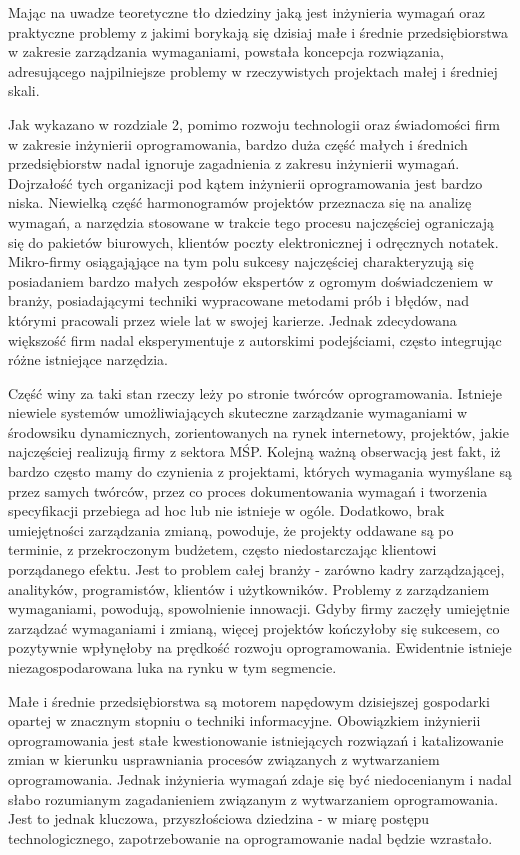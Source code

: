     Mając na uwadze teoretyczne tło dziedziny jaką jest inżynieria wymagań oraz praktyczne problemy z jakimi borykają się dzisiaj małe i średnie przedsiębiorstwa w zakresie zarządzania wymaganiami, powstała koncepcja rozwiązania, adresującego najpilniejsze problemy w rzeczywistych projektach małej i średniej skali. 

    Jak wykazano w rozdziale 2, pomimo rozwoju technologii oraz świadomości firm w zakresie inżynierii oprogramowania, bardzo duża część małych \linebreak i średnich przedsiębiorstw nadal ignoruje zagadnienia z zakresu inżynierii wymagań. Dojrzałość tych organizacji pod kątem inżynierii oprogramowania jest bardzo niska. Niewielką część harmonogramów projektów przeznacza się na analizę wymagań, a narzędzia stosowane w trakcie tego procesu najczęściej ograniczają się do pakietów biurowych, klientów poczty elektronicznej i odręcznych notatek. Mikro-firmy osiągająjące na tym polu sukcesy najczęściej charakteryzują się posiadaniem bardzo małych zespołów ekspertów z ogromym doświadczeniem w branży, posiadającymi techniki wypracowane metodami prób i błędów, nad którymi pracowali przez wiele lat w swojej karierze.  Jednak zdecydowana większość firm nadal eksperymentuje z autorskimi podejściami, często integrując różne istniejące narzędzia. 
    
    Część winy za taki stan rzeczy leży po stronie twórców oprogramowania. Istnieje niewiele systemów umożliwiających skuteczne zarządzanie wymaganiami w środowsiku dynamicznych, zorientowanych na rynek internetowy, projektów, jakie najczęściej realizują firmy z sektora MŚP. Kolejną ważną obserwacją jest fakt, iż bardzo często mamy do czynienia z projektami, których wymagania wymyślane są przez samych twórców, przez co proces dokumentowania wymagań i tworzenia specyfikacji przebiega ad hoc lub nie istnieje w ogóle. Dodatkowo, brak umiejętności zarządzania zmianą, powoduje, że projekty oddawane są po terminie, z przekroczonym budżetem, często niedostarczając klientowi porządanego efektu. Jest to problem całej branży - zarówno kadry zarządzającej, analityków, programistów, klientów i użytkowników. Problemy z zarządzaniem wymaganiami, powodują, spowolnienie innowacji. Gdyby firmy zaczęły umiejętnie zarządzać wymaganiami i zmianą, więcej projektów kończyłoby się sukcesem, co pozytywnie wpłynęłoby na prędkość rozwoju oprogramowania. Ewidentnie istnieje niezagospodarowana luka na rynku w tym segmencie. 

    Małe i średnie przedsiębiorstwa są motorem napędowym dzisiejszej gospodarki opartej w znacznym stopniu o techniki informacyjne. Obowiązkiem inżynierii oprogramowania jest stałe kwestionowanie istniejących rozwiązań i katalizowanie zmian w kierunku usprawniania procesów związanych z wytwarzaniem oprogramowania. Jednak inżynieria wymagań zdaje się być niedocenianym i nadal słabo rozumianym zagadanieniem związanym z wytwarzaniem oprogramowania. Jest to jednak kluczowa, przyszłościowa dziedzina - w miarę postępu technologicznego, zapotrzebowanie na oprogramowanie nadal będzie wzrastało.

